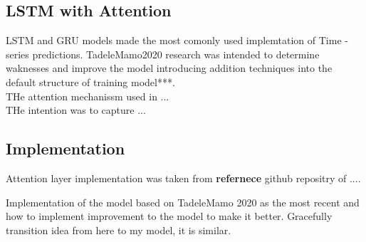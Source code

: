 \subsection{LSTM with Attention}\label{sec:lstm-attention}
LSTM and GRU models made the most comonly used implemtation of Time -series predictions. TadeleMamo2020 research was intended to determine waknesses and improve the model introducing addition techniques into the default structure of training model***. \\
THe attention mechanissm used in ... \\
THe intention was to capture ... \\
\subsection{Implementation}
    Attention layer implementation was taken from \textbf{refernece} github repositry of ....
    
Implementation of the model based on TadeleMamo 2020 as the most recent and how to implement improvement to the model to make it better. Gracefully transition idea from here to my model, it is similar.